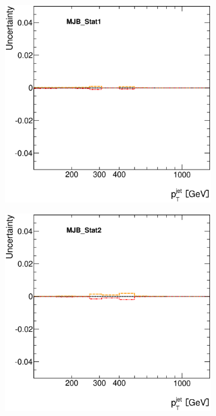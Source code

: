 \documentclass[12pt, twoside]{article}
\numberwithin{equation}{section}
\numberwithin{figure}{section}
\newenvironment{changemargin}[2]{%
\begin{list}{}{%
\setlength{\topsep}{0pt}%
\setlength{\leftmargin}{#1}%
\setlength{\rightmargin}{#2}%
\setlength{\listparindent}{\parindent}%
\setlength{\itemindent}{\parindent}%
\setlength{\parsep}{\parskip}%
}%
\item[]}{\end{list}}
\begin{document}
\begin{figure}[H]
\begin{changemargin}{-1.0cm}{-0.75cm}
\begin{changemargin}{-0.75cm}{-1.0cm}
\begin{subfigure}[b]{0.25\textwidth}
        \end{subfigure}
        \begin{subfigure}[b]{0.25\textwidth}
            \includegraphics[width=\textwidth]{./images/JetSystematics/JetSystematic-27.eps}
        \end{subfigure}
        \begin{subfigure}[b]{0.25\textwidth}
            \includegraphics[width=\textwidth]{./images/JetSystematics/JetSystematic-28.eps}
        \end{subfigure}


\end{changemargin}
\end{changemargin}
\end{figure}
\end{document}
